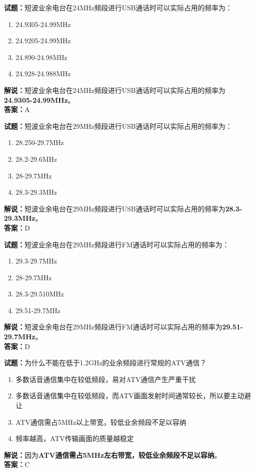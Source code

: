 \documentclass{ctexbook}
\begin{document}
\noindent\textbf{试题：}短波业余电台在24\unit{\MHz}频段进行USB通话时可以实际占用的频率为：
\begin{enumerate}[leftmargin=3em]
\item 24.9305-24.99\unit{\MHz}
\item 24.9205-24.99\unit{\MHz}
\item 24.890-24.98\unit{\MHz}
\item 24.928-24.988\unit{\MHz}
\end{enumerate}
\noindent\textbf{解说：}短波业余电台在24\unit{\MHz}频段进行USB通话时可以实际占用的频率为\textbf{24.9305-24.99\unit{\MHz}}。\\\noindent\textbf{答案：}A

\bigskip




\noindent\textbf{试题：}短波业余电台在29\unit{\MHz}频段进行USB通话时可以实际占用的频率为：
\begin{enumerate}[leftmargin=3em]
\item 28.250-29.7\unit{\MHz}
\item 28.2-29.6\unit{\MHz}
\item 28-29.7\unit{\MHz}
\item 28.3-29.3\unit{\MHz}
\end{enumerate}
\noindent\textbf{解说：}短波业余电台在29\unit{\MHz}频段进行USB通话时可以实际占用的频率为\textbf{28.3-29.3\unit{\MHz}}。\\\noindent\textbf{答案：}D

\bigskip




\noindent\textbf{试题：}短波业余电台在29\unit{\MHz}频段进行FM通话时可以实际占用的频率为：
\begin{enumerate}[leftmargin=3em]
\item 29.3-29.7\unit{\MHz}
\item 28-29.7\unit{\MHz}
\item 28.3-29.510\unit{\MHz}%
\item 29.51-29.7\unit{\MHz}
\end{enumerate}
\noindent\textbf{解说：}短波业余电台在29\unit{\MHz}频段进行FM通话时可以实际占用的频率为\textbf{29.51-29.7\unit{\MHz}}。\\\noindent\textbf{答案：}D

\bigskip




\noindent\textbf{试题：}为什么不能在低于1.2\unit{\GHz}的业余频段进行常规的ATV通信？
\begin{enumerate}[leftmargin=3em]
\item 多数话音通信集中在较低频段，易对ATV通信产生严重干扰
\item 多数话音通信集中在较低频段，而ATV画面发射时间通常较长，所以要主动避让
\item ATV通信需占5\unit{\MHz}以上带宽，较低业余频段不足以容纳
\item 频率越高，ATV传输画面的质量越稳定
\end{enumerate}
\noindent\textbf{解说：}因为\textbf{ATV通信需占5\unit{\MHz}左右带宽，较低业余频段不足以容纳}。\\\noindent\textbf{答案：}C
\end{document}
